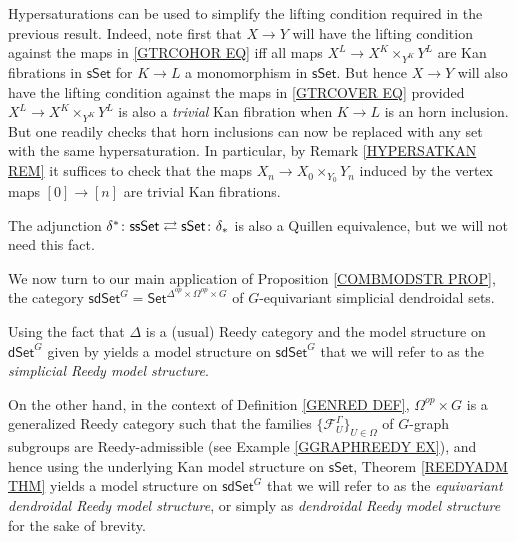 \documentclass[a4paper,10pt,draft]{article}%
\begin{document}
\begin{remark}\label{HYPERSIMPL REM}
	Hypersaturations can be used to simplify the lifting condition required in the previous result. 
	Indeed, note first that $X \to Y$ will have the lifting condition against the maps in \eqref{GTRCOHOR EQ} iff
	all maps $X^L \to X^K \times_{Y^K} Y^L$
	are Kan fibrations in $\mathsf{sSet}$ for $K\to L$ a monomorphism in $\mathsf{sSet}$.
	But hence $X \to Y$ will also have the lifting condition
	against the maps in \eqref{GTRCOVER EQ} provided 
	$X^L \to X^K \times_{Y^K} Y^L$ is also a \textit{trivial} Kan fibration when $K\to L$ is an horn inclusion.
	But one readily checks that horn inclusions can now be replaced with any set with the same hypersaturation. In particular, by Remark \ref{HYPERSATKAN REM} it suffices to check that the maps $X_n \to X_0 \times_{Y_0} Y_n$ induced by the vertex maps $[0] \to [n]$ are trivial Kan fibrations.
\end{remark}



\begin{remark}
The adjunction 
$
	\delta^{\**}\colon \mathsf{ssSet}
		\rightleftarrows 
	\mathsf{sSet} \colon \delta_{\**}
$
is also a Quillen equivalence, but we will not need this fact.
\end{remark}


We now turn to our main application of Proposition \ref{COMBMODSTR PROP}, the category 
$\mathsf{sdSet}^G = \mathsf{Set}^{\Delta^{op} \times \Omega^{op} \times G}$
of $G$-equivariant simplicial dendroidal sets.

Using the fact that $\Delta$ is a (usual) Reedy category
and the model structure on $\mathsf{dSet}^G$ given by 
\cite[Thm. 2.1]{Per17}
yields a model structure on $\mathsf{sdSet}^G$
that we will refer to as the \textit{simplicial Reedy model structure}.

On the other hand, in the context of Definition \ref{GENRED DEF},
$\Omega^{op} \times G$ is a generalized Reedy category such that the families $\{\mathcal{F}_{U}^{\Gamma}\}_{U \in \Omega}$
of $G$-graph subgroups are Reedy-admissible 
(see Example \ref{GGRAPHREEDY EX}), 
and hence using the underlying 
Kan model structure on $\mathsf{sSet}$, 
Theorem \ref{REEDYADM THM} yields
a model structure on $\mathsf{sdSet}^G$
that we will refer to as the \textit{equivariant dendroidal Reedy model structure}, 
or simply as \textit{dendroidal Reedy model structure} for the sake of brevity.
\end{document}
